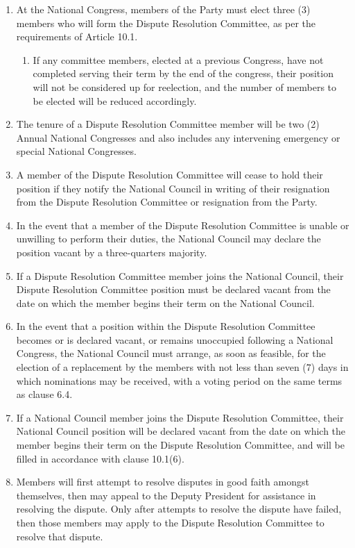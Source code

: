 \documentclass[a4paper,titlepage,8.5pt]{article}
\begin{document}
\begin{enumerate}
\item At the National Congress, members of the Party must elect three (3) members who will form the Dispute Resolution Committee, as per the requirements of Article 10.1.
\begin{enumerate}
    \item If any committee members, elected at a previous Congress, have not completed serving their term by the end of the congress, their position will not be considered up for reelection, and the number of members to be elected will be reduced accordingly.
\end{enumerate}
\item The tenure of a Dispute Resolution Committee member will be two (2) Annual National Congresses and also includes any intervening emergency or special National Congresses.
\item A member of the Dispute Resolution Committee will cease to hold their position if they notify the National Council in writing of their resignation from the Dispute Resolution Committee or resignation from the Party.
\item In the event that a member of the Dispute Resolution Committee is unable or unwilling to perform their duties, the National Council may declare the position vacant by a three-quarters majority.
\item If a Dispute Resolution Committee member joins the National Council, their Dispute Resolution Committee position must be declared vacant from the date on which the member begins their term on the National Council.
\item In the event that a position within the Dispute Resolution Committee becomes or is declared vacant, or remains unoccupied following a National Congress, the National Council must arrange, as soon as feasible, for the election of a replacement by the members with not less than seven (7) days in which nominations may be received, with a voting period on the same terms as clause 6.4.
\item If a National Council member joins the Dispute Resolution Committee, their National Council position will be declared vacant from the date on which the member begins their term on the Dispute Resolution Committee, and will be filled in accordance with clause 10.1(6).
\item Members will first attempt to resolve disputes in good faith amongst themselves, then may appeal to the Deputy President for assistance in resolving the dispute. Only after attempts to resolve the dispute have failed, then those members may apply to the Dispute Resolution Committee to resolve that dispute.

\end{enumerate}
\end{document}
